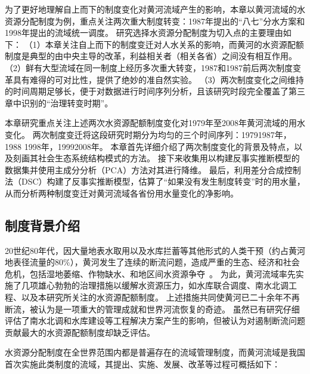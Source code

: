 
为了更好地理解自上而下的制度变化对黄河流域产生的影响，本章以黄河流域的水资源分配制度为例，重点关注两次重大制度转变：1987年提出的``八七''分水方案和1998年提出的流域统一调度。
研究选择水资源分配制度为切入点的主要理由如下：
（1）本章关注自上而下的制度变迁对人\textendash{}水关系的影响，而黄河的水资源配额制度是典型的由中央主导的改革，利益相关者（相关各省）之间没有相互作用。
（2）鲜有大型流域在同一制度上经历多次重大转变，1987和1987前后两次制度变革具有难得的可对比性，提供了绝妙的准自然实验。
（3）两次制度变化之间维持的时间周期足够长，便于对数据进行时间序列分析，且该研究时段完全覆盖了第三章中识别的“治理转变时期”。

本章研究重点关注上述两次水资源配额制度变化对1979年至2008年黄河流域的用水变化。
两次制度变迁将这段研究时期分为均匀的三个时间序列：1979\textendash{}1987年，1988 \textendash{}1998年，1999\textendash{}2008年。
本章首先详细介绍了两次制度变化的背景及特点，以及刻画其社会\textendash{}生态系统结构模式的方法。
接下来收集用以构建反事实推断模型的数据集并使用主成分分析（PCA）方法对其进行降维。
最后，利用差分合成控制法（DSC）构建了反事实推断模型\cite{arkhangelsky2021}，估算了“如果没有发生制度转变”时的用水量，从而分析两种制度变迁对黄河流域各省份用水量变化的净影响。

\subsection{制度背景介绍}\label{sec:yrb}

20世纪80年代，因大量地表水取用以及水库拦蓄等其他形式的人类干预（约占黄河地表径流量的$80\%$），黄河发生了连续的断流问题，造成严重的生态、经济和社会危机，包括湿地萎缩、作物缺水、和地区间水资源争夺~\cite{fu2021}。
为此，黄河流域率先实施了几项雄心勃勃的治理措施以缓解水资源压力，如水库联合调度、南水北调工程、以及本研究所关注的水资源配额制度\cite{long2020, wang2019b}。
上述措施共同使黄河已二十余年不再断流，被认为是一项重大的管理成就和世界河流恢复的奇迹。
虽然已有研究仔细评估了南水北调和水库建设等工程解决方案产生的影响\cite{long2020,wang2019c}，但被认为对遏制断流问题贡献最大的水资源配额制度却缺乏评估\cite{wang2019b}。

水资源分配制度在全世界范围内都是普遍存在的流域管理制度，而黄河流域是我国首次实施此类制度的流域，其提出、实施、发展、改革等过程可概括如下\cite{wang2019b}：

